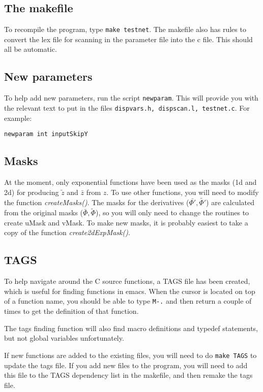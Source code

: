 \documentclass[a4paper]{article}
\newcommand{\zbar}{\bar{z}}
\newcommand{\ztilde}{\tilde{z}}
\newcommand{\lkernel}{\bar{\Phi}}
\newcommand{\skernel}{\tilde{\Phi}}
\newcommand{\dskernel}{\tilde{\Phi'}}
\newcommand{\dlkernel}{\bar{\Phi'}}
\begin{document}
\subsection{The makefile}

To recompile the program, type \texttt{make testnet}.  The makefile
also has rules to convert the lex file for scanning in the parameter
file into the c file.  This should all be automatic.

\subsection{New parameters}

To help add new parameters, run the script \texttt{newparam}.  This
will provide you with the relevant text to put in the files
\texttt{dispvars.h, dispscan.l, testnet.c}.   For example:

\texttt{newparam int inputSkipY}


\subsection{Masks}

At the moment, only exponential functions have been used as the masks
(1d and 2d) for producing $\ztilde$ and $\zbar$ from $z$.  To use
other functions,  you will need to modify the function {\em createMasks()}.
The masks for the derivatives  ($\dlkernel, \dskernel$) are calculated
from the original masks ($\lkernel, \skernel$), so you will only need
to change the routines to create uMask and vMask.  To make new masks,
it is probably easiest to take a copy of the function
{\em create2dExpMask()}.


\subsection{TAGS}

To help navigate around the C source functions, a TAGS file has been
created, which is useful for finding functions in emacs.   When the
cursor is located on top of a function name, you should be able to
type \texttt{M-.} and then return a couple of times to get the
definition of that function.

The tags finding function will also find macro definitions and typedef
statements, but not global variables unfortunately.  

If new functions are added to the existing files, you will need to do
\texttt{make TAGS} to update the tags file.  If you add new files to
the program, you will need to add this file to the TAGS dependency
list in the makefile, and then remake the tags file.
\end{document}
